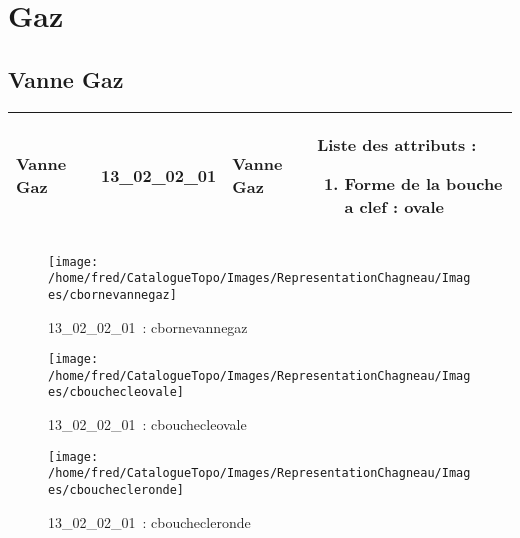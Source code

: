 \documentclass[12pt,titlepage]{book}
\begin{document}
\section{\large Gaz}
\subsection{Vanne Gaz}
\noindent
\vspace{\baselineskip}

\renewcommand{\arraystretch}{1.2}
\begin{supertabular}{|p{10cm}|c|p{13cm}|p{12cm}|}
 Vanne Gaz & 13\_02\_02\_01 & Vanne Gaz & Liste des attributs :
\begin{enumerate}
  \item Forme de la bouche a clef : ovale\end{enumerate}
\\
\hline
\end{supertabular}
\begin{figure}[h!]
  \hfill         %
  \begin{minipage}[t]{3cm}
    \begin{center}
      \texttt{[image: /home/fred/CatalogueTopo/Images/RepresentationChagneau/Images/cbornevannegaz]}
      \caption[~13\_02\_02\_01]{\small{13\_02\_02\_01~:} \tiny{cbornevannegaz}}\label{cbornevannegaz}
    \end{center}
  \end{minipage}
  \begin{minipage}[t]{3cm}
    \begin{center}
      \texttt{[image: /home/fred/CatalogueTopo/Images/RepresentationChagneau/Images/cbouchecleovale]}
      \caption[~13\_02\_02\_01]{\small{13\_02\_02\_01~:} \tiny{cbouchecleovale}}\label{cbouchecleovale}
    \end{center}
  \end{minipage}
  \begin{minipage}[t]{3cm}
    \begin{center}
      \texttt{[image: /home/fred/CatalogueTopo/Images/RepresentationChagneau/Images/cbouchecleronde]}
      \caption[~13\_02\_02\_01]{\small{13\_02\_02\_01~:} \tiny{cbouchecleronde}}\label{cbouchecleronde}
    \end{center}
  \end{minipage}
\end{figure}
\end{document}
